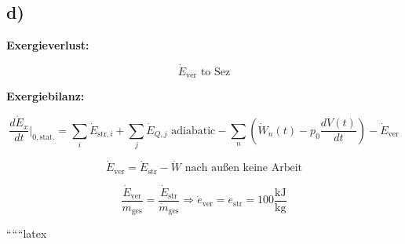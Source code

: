 

\subsection*{d)}

\textbf{Exergieverlust:}

\[
\dot{E}_{\text{ver}} \text{ to } \text{Sez}
\]

\textbf{Exergiebilanz:}

\[
\frac{d\dot{E}_x}{dt} \bigg|_{0, \text{stat.}} = \sum_i \dot{E}_{\text{str}, i} + \sum_j \dot{E}_{Q, j} \text{ adiabatic} - \sum_n \left( \dot{W}_n(t) - p_0 \frac{dV(t)}{dt} \right) - \dot{E}_{\text{ver}}
\]

\[
\dot{E}_{\text{ver}} = \dot{E}_{\text{str}} - \dot{W} \text{ nach außen keine Arbeit}
\]

\[
\frac{\dot{E}_{\text{ver}}}{m_{\text{ges}}} = \frac{\dot{E}_{\text{str}}}{\dot{m}_{\text{ges}}} \Rightarrow \dot{e}_{\text{ver}} = e_{\text{str}} = 100 \frac{\text{kJ}}{\text{kg}}
\]

``````latex